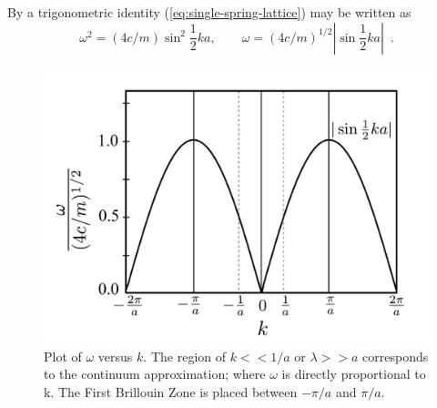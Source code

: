 \documentclass[12pt,letterpaper]{article}
\begin{document}
By a trigonometric identity (\ref{eq:single-spring-lattice}) may be written as
\begin{equation}
\omega^2 = (4c/m) \sin^2 \frac{1}{2}ka, \qquad \omega = (4c/m)^{1/2}\left\vert \sin \frac{1}{2} ka\right\vert \enspace .
\end{equation}

\begin{figure}[h]
\centering
\includegraphics[height=8cm]{img/spring-mass-plot.pdf} 
\caption{Plot of $\omega$ versus $k$. The region of $k<<1/a$ or $\lambda>>a$ corresponds to the continuum approximation; where $\omega$ is directly proportional to k. The First Brillouin Zone is placed between $-\pi/a$ and $\pi/a$.}
\end{figure}
\end{document}
